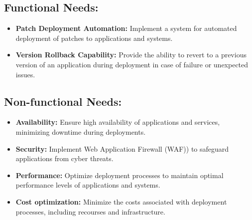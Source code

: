 \subsection{Functional Needs:}
\begin{itemize}
    \item \textbf{Patch Deployment Automation:} Implement a system for automated deployment of patches to applications and systems.
    \item \textbf{Version Rollback Capability:} Provide the ability to revert to a previous version of an application during deployment in case of failure or unexpected issues.
\end{itemize}
\subsection{Non-functional Needs:}
\noindent
\begin{itemize}
    \item \textbf{Availability:} Ensure high availability of applications and services, minimizing downtime during deployments.
    \item \textbf{Security:} Implement Web Application Firewall (WAF)) to safeguard applications from cyber threats.
    \item \textbf{Performance:} Optimize deployment processes to maintain optimal performance levels of applications and systems.
    \item \textbf{Cost optimization:} Minimize the costs associated with deployment processes, including recourses and infrastructure.
\end{itemize}

